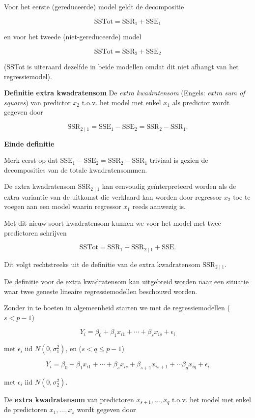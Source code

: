 \documentclass[
  12pt,dutch,coursenotes]{book}
\theoremstyle{definition}
\theoremstyle{definition}
\theoremstyle{definition}
\theoremstyle{definition}
\theoremstyle{remark}
\begin{document}
Voor het eerste (gereduceerde) model geldt de decompositie

\[
  \text{SSTot} = \text{SSR}_1 + \text{SSE}_1
\]

en voor het tweede (niet-gereduceerde) model

\[
  \text{SSTot} = \text{SSR}_2 + \text{SSE}_2
\]

(SSTot is uiteraard dezelfde in beide modellen omdat dit niet afhangt van het regressiemodel).

\textbf{Definitie extra kwadratensom}
De \emph{extra kwadratensom} (Engels: \emph{extra sum of squares}) van predictor \(x_2\) t.o.v. het model met enkel \(x_1\) als predictor wordt gegeven door

\[
  \text{SSR}_{2\mid 1} = \text{SSE}_1-\text{SSE}_2=\text{SSR}_2-\text{SSR}_1.
\]

\textbf{Einde definitie}

Merk eerst op dat \(\text{SSE}_1-\text{SSE}_2=\text{SSR}_2-\text{SSR}_1\) triviaal is gezien de decomposities van de totale kwadratensommen.

De extra kwadratensom \(\text{SSR}_{2\mid 1}\) kan eenvoudig geïnterpreteerd worden als de extra variantie van de uitkomst die verklaard kan worden door regressor \(x_2\) toe te voegen aan een model waarin regressor \(x_1\) reeds aanwezig is.

Met dit nieuw soort kwadratensom kunnen we voor het model met twee predictoren schrijven

\[
  \text{SSTot} = \text{SSR}_1+ \text{SSR}_{2\mid 1} + \text{SSE}.
\]

Dit volgt rechtstreeks uit de definitie van de extra kwadratensom \(\text{SSR}_{2\mid 1}\).

De definitie voor de extra kwadratensom kan uitgebreid worden naar een situatie waar twee geneste lineaire regressiemodellen beschouwd worden.

Zonder in te boeten in algemeenheid starten we met de regressiemodellen (\(s<p-1\))

\[
Y_i = \beta_0 + \beta_1 x_{i1} + \cdots + \beta_{s} x_{is} + \epsilon_i
\]

met \(\epsilon_i\text{ iid }N(0,\sigma_1^{2})\), en (\(s< q\leq p-1\))

\[
Y_i = \beta_0 + \beta_1 x_{i1} + \cdots + \beta_{s} x_{is} + \beta_{s+1} x_{is+1} + \cdots \beta_{q}x_{iq}+ \epsilon_i
\]

met \(\epsilon_i\text{ iid } N(0,\sigma_2^{2})\).

De \textbf{extra kwadratensom} van predictoren \(x_{s+1}, \ldots, x_q\) t.o.v. het model met enkel de predictoren \(x_1,\ldots, x_{s}\) wordt gegeven door
\end{document}
